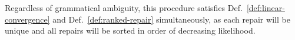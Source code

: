 \documentclass[sigplan,acmsmall,nonacm,screen]{acmart}\settopmatter{printfolios=false,printccs=false,printacmref=false}
\begin{document}
Regardless of grammatical ambiguity, this procedure satisfies Def.~\ref{def:linear-convergence} and Def.~\ref{def:ranked-repair} simultaneously, as each repair will be unique and all repairs will be sorted in order of decreasing likelihood.

%
%
%
%
\end{document}
